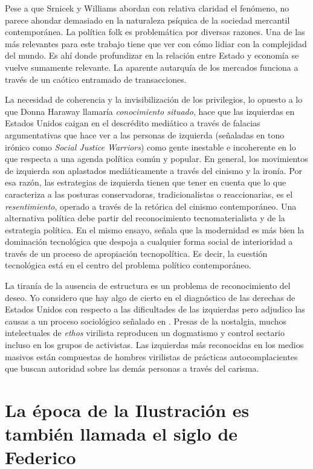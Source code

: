 Pese a que Srnicek y Williams abordan con relativa claridad el fenómeno, no parece ahondar demasiado en la naturaleza psíquica de la sociedad mercantil contemporánea. La política folk es problemática por diversas razones. Una de las más relevantes para este trabajo tiene que ver con cómo lidiar con la complejidad del mundo. Es ahí donde profundizar en la relación entre Estado y economía se vuelve sumamente relevante. La aparente autarquía de los mercados funciona a través de un caótico entramado de transacciones.

La necesidad de coherencia y la invisibilización de los privilegios, lo opuesto a lo que Donna Haraway llamaría \emph{conocimiento situado}, hace que las izquierdas en Estados Unidos caigan en el descrédito mediático a través de falacias argumentativas que hace ver a las personas de izquierda (señaladas en tono irónico como \emph{Social Justice Warriors}) como gente inestable e incoherente en lo que respecta a una agenda política común y popular. En general, los movimientos de izquierda son aplastados mediáticamente a través del cinismo y la ironía. Por esa razón, las estrategias de izquierda tienen que tener en cuenta que lo que caracteriza a las posturas conservadoras, tradicionalistas o reaccionarias, es el \emph{resentimiento}, operado a través de la retórica del cinismo contemporáneo.
 Una alternativa política debe partir del reconocimiento tecnomaterialista y de la estrategia política. En el mismo ensayo, \autocite{huiUnhappyConsciousnessNeoreactionaries2017} señala que la modernidad es más bien la dominación tecnológica que despoja a cualquier forma social de interioridad a través de un proceso de apropiación tecnopolítica. Es decir, la cuestión tecnológica está en el centro del problema político contemporáneo.

La tiranía de la ausencia de estructura es un problema de reconocimiento del deseo. Yo considero que hay algo de cierto en el diagnóstico de las derechas de Estados Unidos con respecto a las dificultades de las izquierdas pero adjudico las causas a un proceso sociológico señalado en \autocite{TyrannyStucturelessness}. Presas de la nostalgia, muchos intelectuales de \emph{ethos} virilista reproducen un dogmatismo y control sectario incluso en los grupos de activistas. Las izquierdas más reconocidas en los medios masivos están compuestas de hombres virilistas de prácticas autocomplacientes que buscan autoridad sobre las demás personas a través del carisma.

\section{La época de la Ilustración es también llamada el siglo de Federico}
\label{sub:la-época-de-ilustración}

